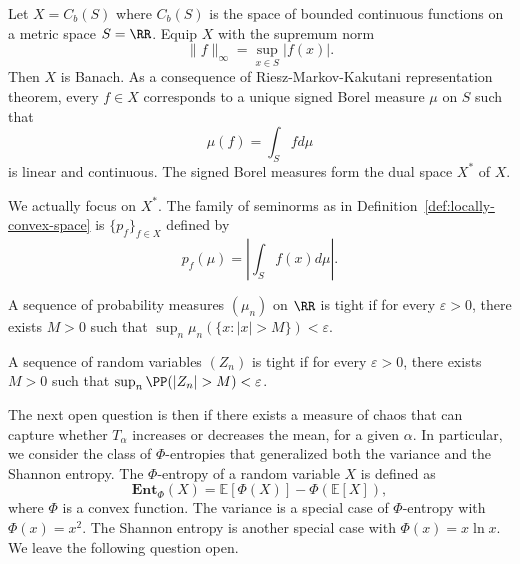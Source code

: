 Let $X=C_b(S)$ where $C_b(S)$ is the space of bounded continuous functions on a metric space $S=\RR$. Equip $X$ with the supremum norm
$$\|f\|_\infty = \sup_{x\in S}|f(x)|.$$
Then $X$ is Banach. As a consequence of Riesz-Markov-Kakutani representation theorem, every $f\in X$ corresponds to a unique signed Borel measure $\mu$ on $S$ such that
$$\mu(f) = \int_S f d\mu$$
is linear and continuous. The signed Borel measures form the dual space $X^*$ of $X$.

We actually focus on $X^*$. The family of seminorms as in Definition~\ref{def:locally-convex-space} is $\{p_f\}_{f\in X}$ defined by
$$p_f(\mu) = \left|\int_S f(x) d\mu\right|.$$


\begin{definition}[Tightness]
  \label{def:tight}
  A sequence of probability measures $(\mu_n)$ on $\RR$ is tight if for every $\varepsilon > 0$, there exists $M > 0$ such that $\sup_n \mu_n(\{x: |x| > M\}) < \varepsilon$.

  A sequence of random variables $(Z_n)$ is tight if for every $\varepsilon > 0$, there exists $M > 0$ such that $\sup_n\PP(|Z_n| > M) < \varepsilon$.
\end{definition}


The next open question is then if there exists a measure of chaos that can capture whether $T_\alpha$ increases or decreases the mean, for a given $\alpha$. In particular, we consider the class of $\Phi$-entropies \cite{chafai2004entropies} that generalized both the variance and the Shannon entropy. The $\Phi$-entropy of a random variable $X$ is defined as
\begin{equation}
  \textbf{Ent}_{\Phi}(X) = \mathbb{E}[\Phi(X)] - \Phi(\mathbb{E}[X]),
\end{equation}
where $\Phi$ is a convex function. The variance is a special case of $\Phi$-entropy with $\Phi(x) = x^2$. The Shannon entropy is another special case with $\Phi(x) = x\ln x$. We leave the following question open.

